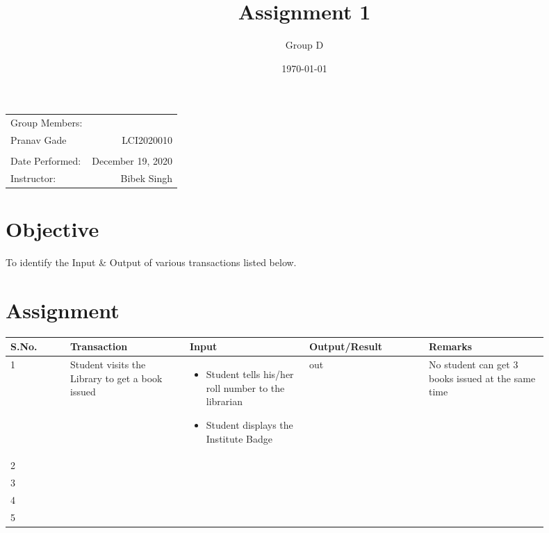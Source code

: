 \documentclass{article}
\title{Assignment 1} %
\author{Group D}
\date{\today} %
\begin{document}
\maketitle %

\begin{center}
\begin{tabular}{l r}
Group Members: & \\
Pranav Gade & LCI2020010\\
&\\
Date Performed: & December 19, 2020 \\ %
Instructor: & Bibek Singh %
\end{tabular}
\end{center}



\section{Objective}

To identify the Input \& Output of various transactions listed below.

\section{Assignment}
\begin{tabular}{|p{0.1\linewidth}|p{0.2\linewidth}|p{0.2\linewidth}|p{0.2\linewidth}|p{0.2\linewidth}|}
	\hline
	S.No. & Transaction & Input & Output/Result & Remarks \\
	\hline
	1 & Student visits the Library to get a book issued & \begin{itemize}
		\item Student tells his/her roll number to the librarian
		\item Student displays the Institute Badge
	\end{itemize} & out & No student can get 3 books issued at the same time \\
	\hline
	2 &  &  &  &  \\
	\hline
	3 &  &  &  &  \\
	\hline
	4 &  &  &  &  \\
	\hline
	5 &  &  &  &  \\
	\hline
\end{tabular}
\end{document}

